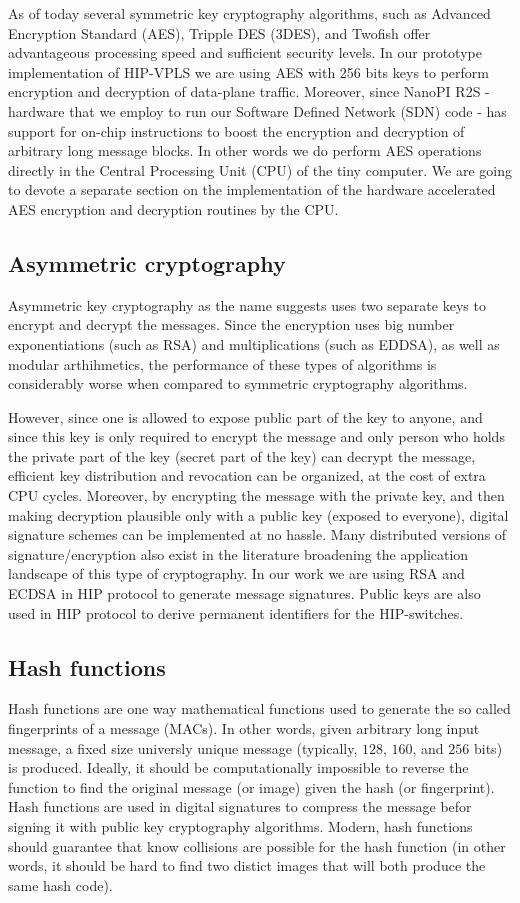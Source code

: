 As of today several symmetric key cryptography algorithms, such as
Advanced Encryption Standard (AES), Tripple DES (3DES), and Twofish
offer advantageous processing speed and sufficient security levels.
In our prototype implementation of HIP-VPLS we are using AES with 256 
bits keys to perform encryption and decryption of data-plane traffic. Moreover,
since NanoPI R2S - hardware that we employ to run our Software Defined Network
(SDN) code - has support for on-chip instructions to boost the 
encryption and decryption of arbitrary long message blocks. In other words
we do perform AES operations directly in the Central Processing Unit (CPU) 
of the tiny computer. We are going to devote a separate section on the 
implementation of the hardware accelerated AES encryption and decryption 
routines by the CPU.

\subsection{Asymmetric cryptography}
Asymmetric key cryptography as the name suggests uses two separate keys
to encrypt and decrypt the messages. Since the encryption uses big number 
exponentiations (such as RSA) and multiplications (such as EDDSA), as well as
modular arthihmetics, the performance of these types of algorithms is 
considerably worse when compared to symmetric cryptography algorithms. 

However, since one is allowed to expose public part of the key to anyone,
and since this key is only required to encrypt the message and only person
who holds the private part of the key (secret part of the key) can decrypt the 
message, efficient key distribution and revocation can be organized, at the cost
of extra CPU cycles. Moreover, by encrypting the message with the private key,
and then making decryption plausible only with a public key (exposed to everyone),
digital signature schemes can be implemented at no hassle. Many distributed 
versions of signature/encryption also exist in the literature broadening the 
application landscape of this type of cryptography. In our work we are using
RSA and ECDSA in HIP protocol to generate message signatures. Public keys are 
also used in HIP protocol to derive permanent identifiers for the HIP-switches.

\subsection{Hash functions}
Hash functions are one way mathematical functions used to generate the so called
fingerprints of a message (MACs). In other words, given arbitrary long input message, a 
fixed size universly unique message (typically, $128$, $160$, and $256$ bits) is 
produced. Ideally, it should be computationally impossible to reverse the function
to find the original message (or image) given the hash (or fingerprint). Hash functions
are used in digital signatures to compress the message befor signing it with 
public key cryptography algorithms. Modern, hash functions should guarantee 
that know collisions are possible for the hash function (in other words, it should 
be hard to find two distict images that will both produce the same hash code).

